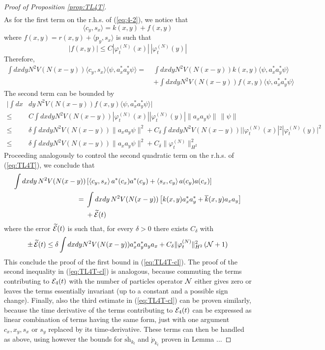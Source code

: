 \documentclass[11pt,a4paper,DIV11]{scrartcl}	%
\newcommand{\wt}{\widetilde}
\newcommand{\cE}{{\cal E}}
\newcommand{\cN}{{\cal N}}
\begin{document}
\begin{proof}[Proof of Proposition \ref{prop:TL4T}]
\[\begin{split}
\end{split} \]
As for the first term on the r.h.s. of (\ref{eq:4-2}), we notice that 
\[ \langle c_y , s_x \rangle = k (x,y) + f(x,y) \]
where $f(x,y) = r(x,y) + \langle p_y , s_x \rangle$ is such that
\[ |f(x,y) | \leq C |\varphi_t^{(N)} (x)| \, | \varphi_t^{(N)} (y)| \]
Therefore,
\[ \begin{split} 
\int dx dy N^2 V(N (x-y)) \langle c_y , s_x \rangle \langle \psi , a^*_x a^*_y \psi \rangle =\; & \int dx dy N^2 V(N (x-y)) k(x,y)  \langle \psi , a^*_x a^*_y \psi \rangle \\ &+ \int dx dy N^2 V(N (x-y)) f(x,y) \langle \psi , a^*_x a^*_y \psi \rangle
\end{split} \]
The second term can be bounded by
\[ \begin{split} 
\Big| \int dx &dy  \, N^2 V(N (x-y)) f(x,y) \langle \psi , a^*_x a^*_y \psi \rangle \Big| \\  \leq \; &C \int dx dy N^2 V(N (x-y)) |\varphi_t^{(N)} (x)| |\varphi_t^{(N)} (y)| \|  a_x a_y \psi \| \, \| \psi \| \\ \leq \; &\delta \int dx dy N^2 V(N (x-y)) \| a_x a_y \psi \|^2 + C_\delta \int dx dy N^2 V(N(x-y)) | |\varphi_t^{(N)} (x)|^2 |\varphi_t^{(N)} (y)|^2  \\ \leq \; & \delta \int dx dy N^2 V(N(x-y)) \| a_x a_y \psi \|^2 + C_\delta \| \varphi_t^{(N)} \|_{H^2}^2  \end{split} \]
Proceeding analogously to control the second quadratic term on the r.h.s. of (\ref{eq:TL4T}), we conclude that 
\[ \begin{split} 
\int dx dy \, N^2 V (N (x-y)) & \left[ \langle c_y, s_x \rangle \,  a^* (c_x) a^* (c_y)  + \langle s_x, c_y \rangle \, a (c_y)  a(c_x) \right] \\  = \; & \int dx dy \, N^2 V(N(x-y))  \left[ k(x,y) a^*_x a^*_y + \overline{k} (x,y) a_x a_y \right] \\ &+ \wt{\cE} (t) \end{split} \]
where the error $\wt{\cE} (t)$ is such that, for every $\delta >0$ there exists $C_\delta$ with 
\[ \pm \, \wt{\cE} (t) \leq  \delta \int dx dy N^2 V(N (x-y)) a_x^* a_y^* a_y a_x + C_\delta \| \varphi_t^{(N)}  \|_{H^2}^2 \,  (\cN + 1) \]
This conclude the proof of the first bound in (\ref{eq:TL4T-cl}).  The proof of the second inequality in (\ref{eq:TL4T-cl}) is analogous, because commuting the terms contributing to $\cE_4 (t)$ with the number of particles operator $\cN$ either gives zero or leaves the terms essentially invariant (up to a constant and a possible sign change). Finally, also the third estimate in (\ref{eq:TL4T-cl}) can be proven similarly, because the time derivative of the terms contributing to $\cE_4 (t)$ can be expressed as linear combination of terms having the same form, just with one argument $c_x,x_y,s_x$ or $s_y$ replaced by its time-derivative. These terms can then be handled as above, using however 
the bounds for $ \dot{\text{sh}}_{k_t}$ and $\dot{p}_{k_t}$ proven in Lemma ...
\end{proof}
\end{document}
